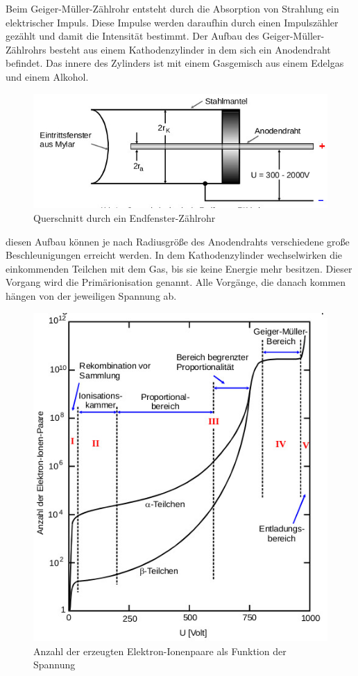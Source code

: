 Beim Geiger-Müller-Zählrohr entsteht durch die Absorption von Strahlung ein elektrischer Impuls.
Diese Impulse werden daraufhin durch einen Impulszähler gezählt und damit die Intensität bestimmt.
Der Aufbau des Geiger-Müller-Zählrohrs besteht aus einem Kathodenzylinder in dem sich ein Anodendraht befindet.
Das innere des Zylinders ist mit einem Gasgemisch aus einem Edelgas und einem Alkohol. \cite{V703}
\begin{figure}[H]
    \centering
    \includegraphics[width=\linewidth]{images/endfenster.jpg}
    \caption{Querschnitt durch ein Endfenster-Zählrohr}
    \label{fig:1}
\end{figure}
\justifying diesen Aufbau können je nach Radiusgröße des Anodendrahts verschiedene 
große Beschleunigungen erreicht werden.
In dem Kathodenzylinder wechselwirken die einkommenden Teilchen mit dem Gas, bis sie
keine Energie mehr besitzen. Dieser Vorgang wird die Primärionisation genannt.
Alle Vorgänge, die danach kommen hängen von der jeweiligen Spannung ab. \cite{V703}
\begin{figure}[H]
    \centering
    \includegraphics[width=\linewidth]{images/bereich.jpg}
    \caption{Anzahl der erzeugten Elektron-Ionenpaare als Funktion der Spannung }
    \label{fig:2}
\end{figure}
